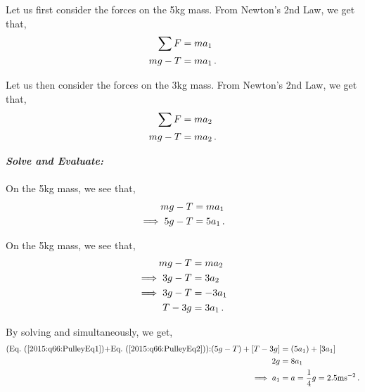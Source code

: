 \begin{subquestions}
	
	
	Let us first consider the forces on the 5kg mass. From Newton's 2nd Law, we get that,
	\begin{align}
		\sum F & = ma_1 \nonumber \\
		mg - T & = ma_1 \,.
	\end{align}
	
	Let us then consider the forces on the 3kg mass. From Newton's 2nd Law, we get that,
	\begin{align}
		\sum F & = ma_2 \nonumber \\
		mg-T & = ma_2 \,.
	\end{align}
	
	
	
	
	\textbf{\textit{Solve and Evaluate:}} \\ \\
	On the 5kg mass, we see that,
	\begin{align}
		mg - T & = ma_1 \nonumber \\
		\implies 5g-T & = 5a_1 \,. \label{2015:q66:PulleyEq1}
	\end{align}
	
	On the 5kg mass, we see that,
	\begin{align}
		mg - T & = ma_2 \nonumber \\
		\implies 3g-T & = 3a_2 \nonumber \\
		\implies 3g-T & = -3a_1 \nonumber \\
		T-3g & = 3a_1 \,. \label{2015:q66:PulleyEq2}
	\end{align}
	
	
	
	
	By solving  and  simultaneously, we get,
	\begin{align}
		\text{(\req{2015:q66:PulleyEq1}+\req{2015:q66:PulleyEq2}):} (5g-T)+[T-3g] & = (5a_1)+[3a_1] \nn \\
		2g & = 8a_1 \nn \\
		\implies a_1 & = a = \frac{1}{4}g = 2.5\text{ms}^{-2} \,.
	\end{align}
	
	
	
	
	
\end{subquestions}